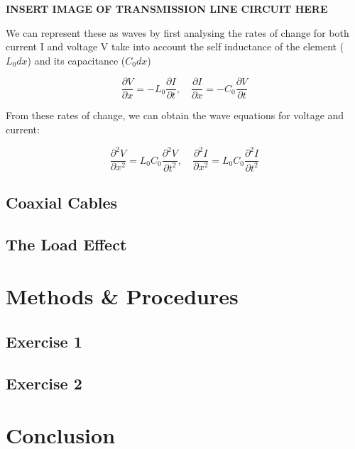 \documentclass{article} %
\begin{document}
\textbf{INSERT IMAGE OF TRANSMISSION LINE CIRCUIT HERE}

We can represent these as waves by first analysing the rates of change for both current I and voltage V take into account the self inductance of the element ($L_0dx$) and its capacitance ($C_0dx$)

\[
\frac{\partial V}{\partial x} = -L_0\frac{\partial I}{\partial t}, \quad \frac{\partial I}{\partial x} = -C_0\frac{\partial V}{\partial t}
\]

From these rates of change, we can obtain the wave equations for voltage and current:

\[
\frac{\partial^2 V}{\partial x^2} = L_0C_0\frac{\partial^2 V}{\partial t^2}, \quad \frac{\partial^2 I}{\partial x^2} = L_0C_0\frac{\partial^2 I}{\partial t^2}
\]

\subsection{Coaxial Cables}

\subsection{The Load Effect}

\section{Methods \& Procedures}

\subsection{Exercise 1}

\subsection{Exercise 2}

\section{Conclusion}

\label{last_page}

\newpage


\end{document}
